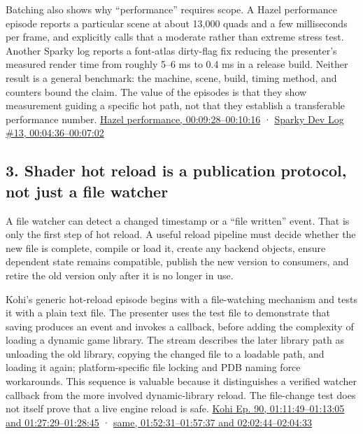 Batching also shows why ``performance'' requires scope. A Hazel performance episode reports a particular scene at about 13,000 quads and a few milliseconds per frame, and explicitly calls that a moderate rather than extreme stress test. Another Sparky log reports a font-atlas dirty-flag fix reducing the presenter's measured render time from roughly 5--6 ms to 0.4 ms in a release build. Neither result is a general benchmark: the machine, scene, build, timing method, and counters bound the claim. The value of the episodes is that they show measurement guiding a specific hot path, not that they establish a transferable performance number. \href{https://www.youtube.com/watch?v=Yw7RpvmqvSE&t=9m28s}{Hazel performance, 00:09:28--00:10:16} · \href{https://www.youtube.com/watch?v=njTgcayfhJU&t=4m36s}{Sparky Dev Log \#13, 00:04:36--00:07:02}

\subsection{3. Shader hot reload is a publication protocol, not just a file watcher}\label{06-engine-ii-ch041-shader-hot-reload-is-a-publication-protocol-not-just-a-file-watcher}

\hypertarget{06-engine-ii-ch041-shader-hot-reload-is-a-publication-protocol-not-just-a-file-watcher}{}

A file watcher can detect a changed timestamp or a ``file written'' event. That is only the first step of hot reload. A useful reload pipeline must decide whether the new file is complete, compile or load it, create any backend objects, ensure dependent state remains compatible, publish the new version to consumers, and retire the old version only after it is no longer in use.

Kohi's generic hot-reload episode begins with a file-watching mechanism and tests it with a plain text file. The presenter uses the test file to demonstrate that saving produces an event and invokes a callback, before adding the complexity of loading a dynamic game library. The stream describes the later library path as unloading the old library, copying the changed file to a loadable path, and loading it again; platform-specific file locking and PDB naming force workarounds. This sequence is valuable because it distinguishes a verified watcher callback from the more involved dynamic-library reload. The file-change test does not itself prove that a live engine reload is safe. \href{https://www.youtube.com/watch?v=SBG-qrT8wmg&t=1h11m49s}{Kohi Ep. 90, 01:11:49--01:13:05 and 01:27:29--01:28:45} · \href{https://www.youtube.com/watch?v=SBG-qrT8wmg&t=1h52m31s}{same, 01:52:31--01:57:37 and 02:02:44--02:04:33}

